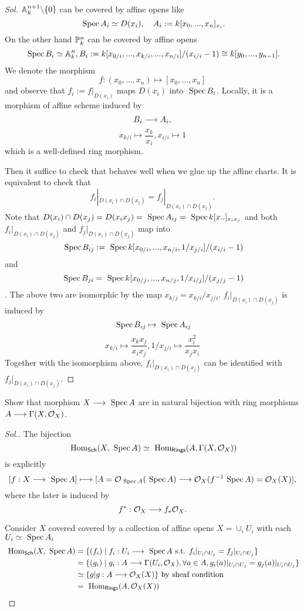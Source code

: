 \documentclass[11pt]{book} %
\begin{document}
\begin{proof}[Sol]
$\mathbb A^{n+1}_k\backslash \{0\}$ can be covered by affine opens like
$$
\text{ Spec\,} A_i\simeq D(x_i),\ \ \  A_i:= k[x_0,...,x_n]_{x_i}.
$$
On the other hand $\mathbb P^{n}_{k}$ can be covered by affine opens
$$
\text{ Spec\,} B_i\simeq \mathbb A^{n}_{k}, B_i:=k[x_{0/i},...,x_{k/i},...,x_{n/i}]/(x_{i/i}-1)\cong k[y_0,...,y_{n-1}].
$$
We denote the morphism 
$$
f:(x_0,...,x_n)\mapsto [x_0,...,x_n]
$$
and observe that $f_i:=f|_{D(x_i)}$ maps $D(x_i)$ into $\text{ Spec\,} B_i$. Locally, it is a morphism of affine scheme induced by 
$$
B_i\longrightarrow A_i,
$$
$$
x_{k/i}\mapsto \frac{x_{k}}{x_i}, x_{i/i}\mapsto 1
$$
which is a well-defined ring morphism.

Then it suffice to check that behaves well when we glue up the affine charts. It is equivalent to check that
$$
f_i|_{D(x_i)\cap D(x_j)}=f_j|_{D(x_i)\cap D(x_j)}.
$$
Note that $D(x_i)\cap D(x_j)=D(x_i x_j)=\text{ Spec\,} A_{ij}=\text{ Spec\,} k[x..]_{x_i x_j}$ and both $f_i|_{D(x_i)\cap D(x_j)}$ and $f_j|_{D(x_i)\cap D(x_j)}$ map into $$\text{ Spec\,} B_{ij}:=\text{ Spec\,} k[x_{0/i},...,x_{n/i}, 1/x_{j/i}]/(x_{i/i}-1)$$ and $$\text{ Spec\,} B_{ji}=\text{ Spec\,} k[x_{0/j},...,x_{n/j},1/x_{i/j}]/(x_{j/j}-1)$$.
The above two are isomorphic by the map $x_{k/j}=x_{k/i}/x_{j/i}$.
$
f_i|_{D(x_i)\cap D(x_j)}
$
is induced by
$$
\text{ Spec\,} B_{ij}\mapsto \text{ Spec\,} A_{ij}
$$
$$
x_{k/i}\mapsto \frac{x_k x_j}{x_i x_j},1/x_{j/i}\mapsto \frac{x_i^2}{x_j x_i}
$$
Together with the isomorphism above, $f_i|_{D(x_i)\cap D(x_j)}$ can be identified with $f_j|_{D(x_i)\cap D(x_j)}$.
\end{proof}
\begin{exr}\label{chap6exr:morphism_of_schemes_bijection_morphisms_of_global_sections}
Show that morphism $X\longrightarrow \text{ Spec\,} A$ are in natural bijection with ring morphisms $A\longrightarrow \Gamma(X,{\cal O}_X)$.
\end{exr}
\begin{proof}[Sol.]
The bijection
$$
\text{ Hom}_{\mathsf{Sch}}(X,\text{ Spec\,} A)\simeq \text{ Hom}_{\mathsf{Rings}}(A,\Gamma(X,{\cal O}_X))
$$
is explicitly
$$
[f:X\longrightarrow \text{ Spec\,} A]\longmapsto [A={\cal O}_{\text{ Spec\,} A}(\text{ Spec\,} A)\longrightarrow {\cal O}_X(f^{-1}\text{ Spec\,} A)={\cal O}_X(X)],
$$
where the later is induced by 
$$
f^*:{\cal O}_X\longrightarrow f_*{\cal O}_X.
$$

Consider $X$ covered covered by a collection of affine opens $X=\cup_i U_i$ with each $U_i\simeq\text{ Spec\,} A_i$
$$
\begin{aligned}
\text{ Hom}_{\mathsf{Sch}}(X,\text{ Spec\,} A)&=\{(f_i)\mid f_i:U_i\longrightarrow \text{ Spec\,} A\text{ s.t. }f_i|_{U_i\cap U_j}=f_j|_{U_i\cap U_j}\}\\
&=\{(g_i)\mid g_i: A\longrightarrow \Gamma(U_i, {\cal O}_X),\forall a\in A, g_i(a)|_{U_i\cap U_j}=g_j(a)|_{U_i\cap U_j}\}\\
&\simeq\{g|g:A\longrightarrow {\cal O}_X(X)\}\text{ by sheaf condition}\\
&=\text{ Hom}_{\mathsf{Rings}}(A,{\cal O}_X(X))
\end{aligned}
$$
\end{proof}
\end{document}
